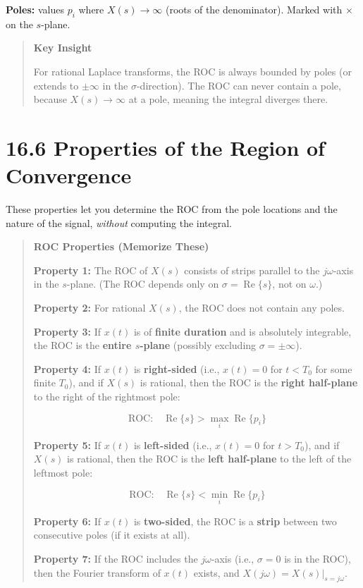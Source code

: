\documentclass[11pt]{article}
\begin{document}
\textbf{Poles:} values $p_i$ where $X(s) \to \infty$ (roots of the denominator). Marked with $\times$ on the $s$-plane.

\begin{quote}
\textbf{Key Insight}

For rational Laplace transforms, the ROC is always bounded by poles (or extends to $\pm\infty$ in the $\sigma$-direction). The ROC can never contain a pole, because $X(s) \to \infty$ at a pole, meaning the integral diverges there.
\end{quote}

\section*{16.6 Properties of the Region of Convergence}

These properties let you determine the ROC from the pole locations and the nature of the signal, \textit{without} computing the integral.

\begin{quote}
\textbf{ROC Properties (Memorize These)}

\textbf{Property 1:} The ROC of $X(s)$ consists of strips parallel to the $j\omega$-axis in the $s$-plane. (The ROC depends only on $\sigma = \operatorname{Re}\{s\}$, not on $\omega$.)

\textbf{Property 2:} For rational $X(s)$, the ROC does not contain any poles.

\textbf{Property 3:} If $x(t)$ is of \textbf{finite duration} and is absolutely integrable, the ROC is the \textbf{entire $s$-plane} (possibly excluding $\sigma = \pm\infty$).

\textbf{Property 4:} If $x(t)$ is \textbf{right-sided} (i.e., $x(t) = 0$ for $t < T_0$ for some finite $T_0$), and if $X(s)$ is rational, then the ROC is the \textbf{right half-plane} to the right of the rightmost pole:

\[\text{ROC:}\quad \operatorname{Re}\{s\} > \max_i \operatorname{Re}\{p_i\}\]

\textbf{Property 5:} If $x(t)$ is \textbf{left-sided} (i.e., $x(t) = 0$ for $t > T_0$), and if $X(s)$ is rational, then the ROC is the \textbf{left half-plane} to the left of the leftmost pole:

\[\text{ROC:}\quad \operatorname{Re}\{s\} < \min_i \operatorname{Re}\{p_i\}\]

\textbf{Property 6:} If $x(t)$ is \textbf{two-sided}, the ROC is a \textbf{strip} between two consecutive poles (if it exists at all).

\textbf{Property 7:} If the ROC includes the $j\omega$-axis (i.e., $\sigma = 0$ is in the ROC), then the Fourier transform of $x(t)$ exists, and $X(j\omega) = X(s)\big|_{s=j\omega}$.
\end{quote}
\end{document}
